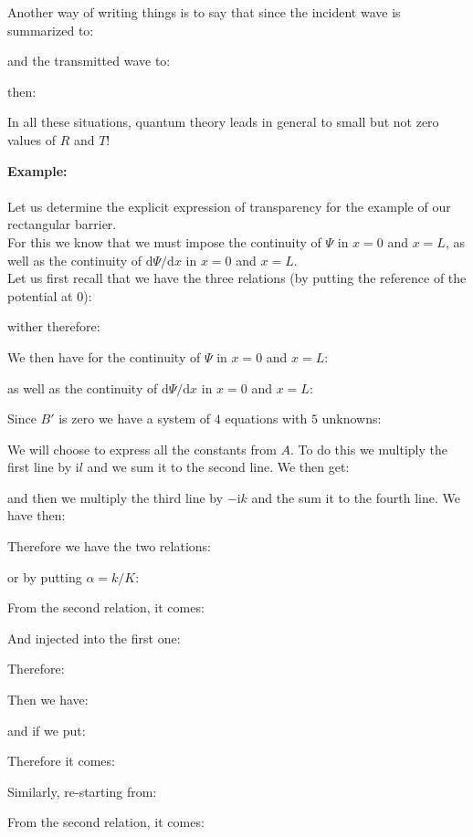 	Another way of writing things is to say that since the incident wave is summarized to:
	
	and the transmitted wave to:
	
	then:
	
	In all these situations, quantum theory leads in general to small but not zero values of $R$ and $T$!
	
	\begin{tcolorbox}[colframe=black,colback=white,sharp corners]
	\textbf{{\Large {}}Example:}\\\\
	Let us determine the explicit expression of transparency for the example of our rectangular barrier.\\ 

	For this we know that we must impose the continuity of $\Psi$ in $x=0$ and $x=L$, as well as the continuity of $\mathrm{d}\Psi/\mathrm{d}x$ in $x=0$ and $x=L$.\\

	Let us first recall that we have the three relations (by putting the reference of the potential at $0$):
	
	wither therefore:
	
	We then have for the continuity of $\Psi$ in $x=0$ and $x=L$:
	
	as well as the continuity of $\mathrm{d}\Psi/\mathrm{d}x$ in $x=0$ and $x=L$:
	
	Since $B'$ is zero we have a system of $4$ equations with $5$ unknowns:
	
	We will choose to express all the constants from $A$. To do this we multiply the first line by $\mathrm{i}l$ and we sum it to the second line. We then get:
	
	and then we multiply the third line by $-\mathrm{i}k$ and the sum it to the fourth line. We have then:
	\end{tcolorbox}
	
	\begin{tcolorbox}[colframe=black,colback=white,sharp corners]
	
	Therefore we have the two relations:
	
	or by putting $\alpha=k/K$:
	
	From the second relation, it comes:
	
	And injected into the first one:
	
	Therefore:
	
	Then we have:
	
	and if we put:
	
	Therefore it comes:
	
	Similarly, re-starting from:
	
	From the second relation, it comes:
	\end{tcolorbox}
	
